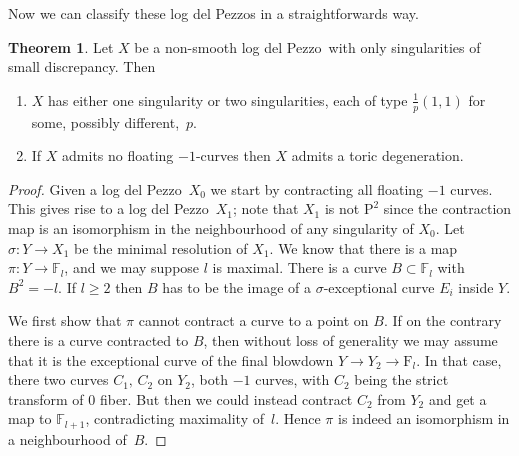 \documentclass[11pt]{amsbook}
\theoremstyle{definition}
\newtheorem{thm}{Theorem}[section]
\theoremstyle{definition}
\theoremstyle{definition}
\theoremstyle{definition}
\theoremstyle{definition}
\theoremstyle{definition}
\theoremstyle{definition}
\theoremstyle{definition}
\newcommand{\ldp}{log del Pezzo}
\newcommand{\mb}[1]{\mathbb{#1}}
\newcommand{\F}{\mathrm{F}}
\renewcommand{\P}{\mathrm{P}}
\begin{document}
Now we can classify these log del Pezzos in a straightforwards way. 
\begin{thm}\label{ThmOnSing}
Let $X$ be a non-smooth \ldp\ with only singularities of small discrepancy. Then 
\begin{enumerate}
\item\label{thm38i}
$X$ has either one singularity or two singularities, each of type $\frac{1}p(1,1)$ for some, possibly different,~$p$.
\item\label{thm38ii}
If $X$ admits no floating $-1$-curves then $X$ admits a toric degeneration. %
\end{enumerate}
\end{thm}
\begin{proof}
Given a \ldp\ $X_0$ we start by contracting all floating $-1$ curves. This gives rise to a \ldp\ $X_1$; note that $X_1$ is not $\P^2$ since the contraction map is an isomorphism in the neighbourhood of any singularity of $X_0$. Let $\sigma\colon Y\rightarrow X_1$ be the minimal resolution of $X_1$. We know that there is a map $\pi \colon Y \rightarrow \mathbb{F}_l$, and we may suppose $l$ is maximal.
There is a curve $B \subset \mathbb{F}_l$ with $B^2 = -l$. 
If $l\ge2$ then $B$ has to be the image of a $\sigma$-exceptional curve $E_i$ inside $Y$.

We first show that $\pi$ cannot contract a curve to a point on $B$.
If on the contrary there is a curve contracted to $B$, then
without loss of generality we may assume that it is the exceptional curve of the final blowdown $Y\rightarrow Y_2\rightarrow\F_l$. In that case, there two curves $C_1, \, C_2$ on $Y_2$, both $-1$ curves, with $C_2$ being the strict transform of $0$ fiber. But then we could instead contract $C_2$ from $Y_2$ and get a map to $\mb{F}_{l+1}$, contradicting maximality of~$l$. 
Hence $\pi$ is indeed an isomorphism in a neighbourhood of~$B$.



\end{proof}
\end{document}
